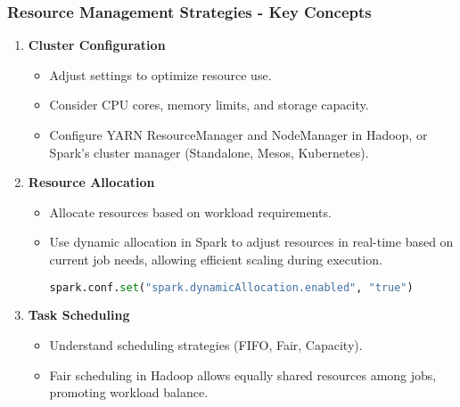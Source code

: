 \documentclass{beamer}
\begin{document}
\begin{frame}[fragile]
    \frametitle{Resource Management Strategies - Key Concepts}
    \begin{enumerate}
        \item \textbf{Cluster Configuration}
        \begin{itemize}
            \item Adjust settings to optimize resource use.
            \item Consider CPU cores, memory limits, and storage capacity.
            \item Configure YARN ResourceManager and NodeManager in Hadoop, or Spark's cluster manager (Standalone, Mesos, Kubernetes).
        \end{itemize}

        \item \textbf{Resource Allocation}
        \begin{itemize}
            \item Allocate resources based on workload requirements.
            \item Use dynamic allocation in Spark to adjust resources in real-time based on current job needs, allowing efficient scaling during execution.
            \begin{lstlisting}[language=Python]
spark.conf.set("spark.dynamicAllocation.enabled", "true")
            \end{lstlisting}
        \end{itemize}

        \item \textbf{Task Scheduling}
        \begin{itemize}
            \item Understand scheduling strategies (FIFO, Fair, Capacity).
            \item Fair scheduling in Hadoop allows equally shared resources among jobs, promoting workload balance.
        \end{itemize}
    \end{enumerate}
\end{frame}
\end{document}
